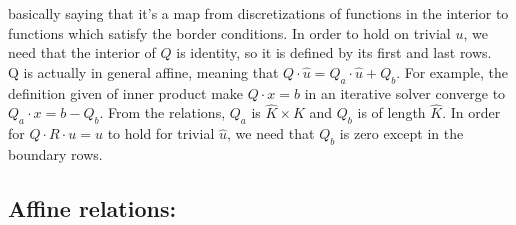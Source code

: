 \documentclass[11pt]{article}
\begin{document}
\begin{itemize}
		basically saying that it's a map from discretizations of functions in the interior to functions which satisfy the border conditions. In order to hold on trivial $u$, we need that the interior of $Q$ is identity, so it is defined by its first and last rows.\\
		Q is actually in general affine, meaning that $Q\cdot \hat{u} = Q_a\cdot \hat{u} + Q_b$. For example, the definition given of inner product make $Q\cdot x=b$ in an iterative solver converge to $Q_a\cdot x = b - Q_b$. From the relations, $Q_a$ is $\hat{K}\times K$ and $Q_b$ is of length $\hat{K}$. In order for $Q\cdot R\cdot u = u$ to hold for trivial $\hat{u}$, we need that $Q_b$ is zero except in the boundary rows.
		
		\end{itemize}
	
		\subsection{Affine relations:}
\end{document}
